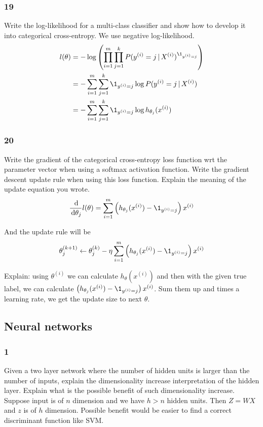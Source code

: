 \documentclass{article}
\begin{document}
\subsubsection*{19}
\begin{myleftlinebox}
    Write the log-likelihood for a multi-class classifier and show how to develop it into categorical cross-entropy.
    \tcblower
    We use negative log-likelihood.
    \begin{equation*}
        \begin{split}
            l(\theta )&= -\log\Pare{\prod_{i=1}^m\prod_{j=1}^k P(y^{(i)}=j\mid X^{(i)})^{\1_{y^{(i)}=j}}}\\
            &=  -\sum_{i=1}^m\sum_{j=1}^k \1_{y^{(i)}=j} \log P(y^{(i)}=j\mid X^{(i)})\\
            &= -\sum_{i=1}^m\sum_{j=1}^k \1_{y^{(i)}=j} \log h_{\theta_j}(x^{(i)})\
        \end{split}
    \end{equation*}
\end{myleftlinebox}

\subsubsection*{20}
\begin{myleftlinebox}
    Write the gradient of the categorical cross-entropy loss function wrt the parameter vector when using a softmax activation function. Write the gradient descent update rule when using this loss function. Explain the meaning of the update equation you wrote.
    \tcblower
    \[
        \frac{\dif}{\dif \theta_j} l(\theta) = \sum_{i=1}^m\Pare{h_{\theta_j}(x^{(i)})-\1_{y^{(i)}=j}}x^{(i)}
    \]
    
    And the update rule will be
    \[
        \theta_j^{(k+1)} \gets\theta_j^{(k)} -\eta \sum_{i=1}^m\Pare{h_{\theta_j}(x^{(i)})-\1_{y^{(i)}=j}}x^{(i)}
    \]

    Explain: using \(\theta^{(i)}\) we can calculate \(h_\theta(x^{(i)})\) and then with the given true label, we can calculate \(\Pare{h_{\theta_j}(x^{(i)})-\1_{y^{(i)}=j}}x^{(i)}\). Sum them up and times a learning rate, we get the update size to next \(\theta\).

\end{myleftlinebox}
\subsection*{Neural networks}
\subsubsection*{1}
\begin{myleftlinebox}
    Given a two layer network where the number of hidden units is larger than the number of inputs, explain the dimensionality increase interpretation of the hidden layer. Explain what is the possible benefit of such dimensionality increase.
    \tcblower
    Suppose input is of \(n\) dimension and we have \(h>n\) hidden units. Then \(Z = WX\) and \(z\) is of \(h\) dimension. Possible benefit would be easier to find a correct discriminant function like SVM.
\end{myleftlinebox}
\end{document}

